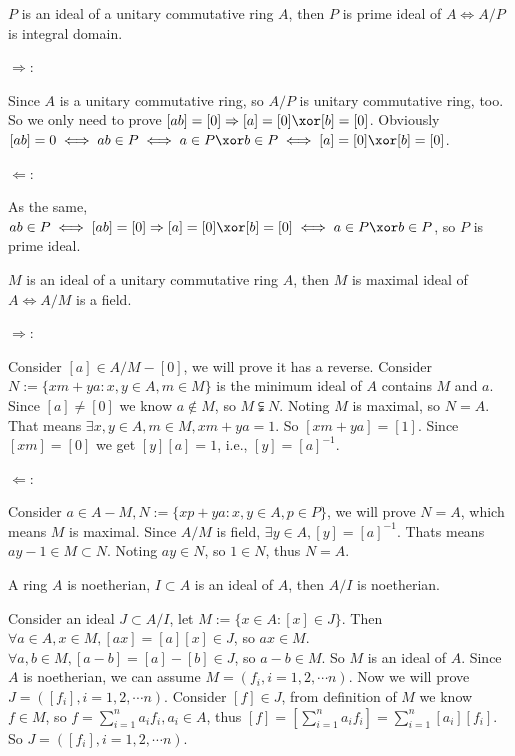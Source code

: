 \documentclass{ctexart}
\newif\ifpreface
\begin{document}
\large
\setlength{\baselineskip}{1.2em}
\ifpreface
    
\newgeometry{left=2cm,right=2cm,top=2cm,bottom=2cm}
\else
{}
\maketitle
\fi
\newcommand{\A}{\mathbbm{A}}
\begin{problem}
 $P$ is an ideal of a unitary commutative ring $A$, then $P$ is prime ideal of $A\iff A/P$ is integral domain.
\end{problem}
\begin{solution}
 $\Rightarrow $:

 Since $A$ is a unitary commutative ring, so $A/P$ is unitary commutative ring, too. So we only need to prove $[ab]=[0]\Rightarrow [a]=[0]\xor [b]=[0]$. 
 Obviously $[ab]=0\iff ab\in P\iff a\in P\xor b\in P\iff [a]=[0]\xor [b]=[0]$. 

 $\Leftarrow $:

 As the same, $ab\in P\iff [ab]=[0]\Rightarrow [a]=[0]\xor [b]=[0]\iff a\in P\xor b\in P$, so $P$ is prime ideal. 
\end{solution}

\begin{problem}
 $M$ is an ideal of a unitary commutative ring $A$, then $M$ is maximal ideal of $A \iff A/M$ is a field.   
\end{problem}
\begin{solution}
 $\Rightarrow $:

 Consider $[a]\in A/M\minus [0]$, we will prove it has a reverse.  Consider $N:=\{xm+ya:x,y\in A,m\in M\}$ is the minimum ideal of $A$ contains $M$ and $a$. 
 Since $[a]\neq [0]$ we know $a\notin M$, so $M\subsetneqq N$. 
 Noting $M$ is maximal, so $N=A$. That means $\exists x,y\in A,m\in M,xm+ya=1$. So $[xm+ya]=[1]$. Since $[xm]=[0]$ we get $[y][a]=1$, i.e., $[y]=[a]^{-1}$. 

 $\Leftarrow $:

 Consider $a\in A\minus M, N:=\{xp+ya:x,y\in A,p\in P\}$, we will prove $N=A$, which means $M$ is maximal. 
 Since $A/M$ is field, $\exists y\in A, [y]=[a]^{-1}$. Thats means $ay-1\in M\subset N$. Noting $ay\in N$, so $1\in N$, thus $N=A$. 
\end{solution}

\begin{problem}
 A ring $A$ is noetherian, $I\subset A$ is an ideal of $A$, then $A/I$ is noetherian. 
\end{problem}
\begin{solution}
 Consider an ideal $J\subset A/I$, let $M:=\{x\in A:[x]\in J\}$. Then $\forall a\in A,x\in M,[ax]=[a][x]\in J$, so $ax\in M$. $\forall a,b\in M,[a-b]=[a]-[b]\in J$, so $a-b\in M$. So $M$ is an ideal of $A$. 
 Since $A$ is noetherian, we can assume $M=(f_i,i=1,2,\cdots n)$. Now we will prove $J=([f_i],i=1,2,\cdots n)$. 
 Consider $[f]\in J$, from definition of $M$ we know $f\in M$, so $f=\sum_{i=1}^na_if_i,a_i\in A$, thus $[f]=\left[\sum_{i=1}^na_if_i\right]=\sum_{i=1}^n[a_i][f_i]$. So $J=([f_i],i=1,2,\cdots n)$. 
\end{solution}
\end{document}
